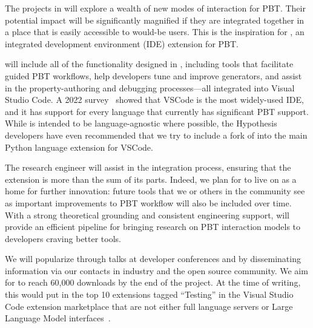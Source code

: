 The projects in  will explore a wealth of new modes of interaction
for PBT. Their potential impact will be significantly magnified if they are
integrated together in a
place that is easily accessible to would-be users. This is the inspiration for
\tyche{}, an integrated development environment (IDE) extension for PBT.

\tyche{} will include all of the functionality designed in ,
including tools that facilitate guided PBT
workflows, help developers tune and
improve generators, and assist in the property-authoring
and debugging processes---all integrated into Visual Studio Code. A 2022 survey~\cite{noauthor_stack_nodate}
showed that VSCode is the most widely-used IDE, and it has support for every
language that currently has significant PBT support.
While \tyche{} is intended to be language-agnostic where possible, the Hypothesis
developers have even recommended that we try to include a fork of
\tyche{} into the main Python language extension for VSCode.

The research engineer will assist in the integration process, ensuring that the
extension is more than the sum of its parts. Indeed, we plan for \tyche{} to
live on as a home for further innovation: future tools that we or others in the
community see as important improvements to PBT workflow will also be included
over time.  With a strong theoretical grounding and consistent engineering
support, \tyche{} will provide an efficient pipeline for bringing research on
PBT interaction models to developers craving better tools.

We will popularize \tyche{} through talks at developer
conferences and by
disseminating information via our contacts in industry and the open source
community.
%
We aim for \tyche{} to reach 60,000 downloads by the end of the
project. At
the time of writing, this would put \tyche{} in the top 10 extensions
tagged ``Testing'' in the Visual Studio Code extension marketplace
that are not either full language servers or Large
Language Model interfaces~\cite{noauthor_testing_nodate}.


